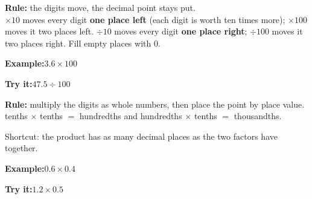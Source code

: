 \documentclass[12pt]{article}
\begin{document}

\begin{formulabox}\textbf{Rule:} the digits move, the decimal point stays put.\\[4pt]
$\times 10$ moves every digit \textbf{one place left} (each digit is worth ten times more);
$\times 100$ moves it two places left. $\div 10$ moves every digit \textbf{one place right};
$\div 100$ moves it two places right. Fill empty places with $0$.
\end{formulabox}
\begin{examplebox}\textbf{Example:}\quad $3.6 \times 100$
\end{examplebox}
\begin{tryitbox}\textbf{Try it:}\quad $47.5 \div 100$\\[2pt]
\end{tryitbox}

\begin{formulabox}\textbf{Rule:} multiply the digits as whole numbers, then place the point by place value.\\[4pt]
tenths $\times$ tenths $=$ hundredths \quad and \quad hundredths $\times$ tenths $=$ thousandths.\par
Shortcut: the product has as many decimal places as the two factors have together.
\end{formulabox}
\begin{examplebox}\textbf{Example:}\quad $0.6 \times 0.4$
\end{examplebox}
\begin{tryitbox}\textbf{Try it:}\quad $1.2 \times 0.5$\\[2pt]
\end{tryitbox}
\end{document}
